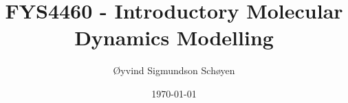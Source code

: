 \documentclass[12pt, a4paper]{article}
\newcommand{\1}{\mathds{1}}
\begin{document}
\title{FYS4460 - Introductory Molecular Dynamics Modelling}
\author{Øyvind Sigmundson Schøyen}
\date{\today}

\maketitle




\end{document}
